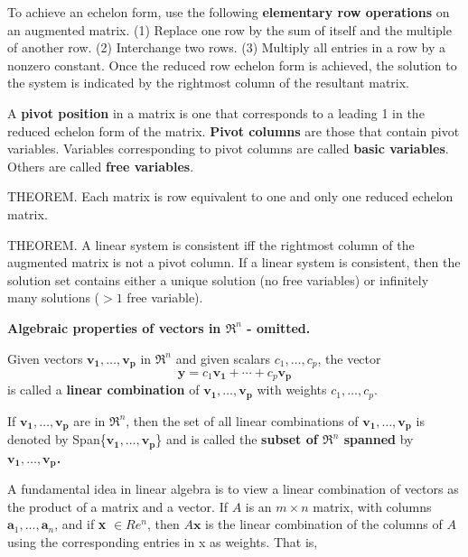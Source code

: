 \documentclass{article}
\begin{document}
\hfill \newline
To achieve an echelon form, use the following \textbf{elementary row operations} on an augmented matrix. (1) Replace one row by the sum of itself and the multiple of another row. (2) Interchange two rows. (3) Multiply all entries in a row by a nonzero constant. Once the reduced row echelon form is achieved, the solution to the system is indicated by the rightmost column of the resultant matrix.

\hfill \newline A \textbf{pivot position} in a matrix is one that corresponds to a leading 1 in the reduced echelon form of the matrix. \textbf{Pivot columns} are those that contain pivot variables. Variables corresponding to pivot columns are called \textbf{basic variables}. Others are called \textbf{free variables}.

\hfill \newline \noindent THEOREM. Each matrix is row equivalent to one and only one reduced echelon matrix.

\hfill \newline \noindent THEOREM. A linear system is consistent iff the rightmost column of the augmented matrix is not a pivot column. If a linear system is consistent, then the solution set contains either a unique solution (no free variables) or infinitely many solutions ($>1$ free variable).

\hfill \newline
\textbf{Algebraic properties of vectors in $\Re^n$ - omitted.}
\hfill \newline

\noindent Given vectors $\mathbf{v_1},\dots,\mathbf{v_p}$ in $\Re^n$ and given scalars $c_1,\dots,c_p$, the vector
\begin{equation}
\mathbf{y} = c_1\mathbf{v_1}+\cdots+c_p\mathbf{v_p} 
\end{equation}
is called a \textbf{linear combination} of $\mathbf{v_1},\dots,\mathbf{v_p}$ with weights $c_1,\dots,c_p$.

\hfill \newline If $\mathbf{v_1},\dots,\mathbf{v_p}$ are in $\Re^n$, then the set of all linear combinations of $\mathbf{v_1},\dots,\mathbf{v_p}$ is denoted by Span\{$\mathbf{v_1},\dots,\mathbf{v_p}$\} and is called the \textbf{subset of $\Re^n$ spanned} by \textbf{$\mathbf{v_1},\dots,\mathbf{v_p}$.}

\hfill \newline A fundamental idea in linear algebra is to view a linear combination of vectors as the product of a matrix and a vector. If $A$ is an $m \times n$ matrix, with columns $\textbf{a}_1,\dots,\textbf{a}_n$, and if \textbf{x} $\in Re^n$, then $A\textbf{x}$ is the linear combination of the columns of $A$ using the corresponding entries in x as weights. That is, 
\end{document}
